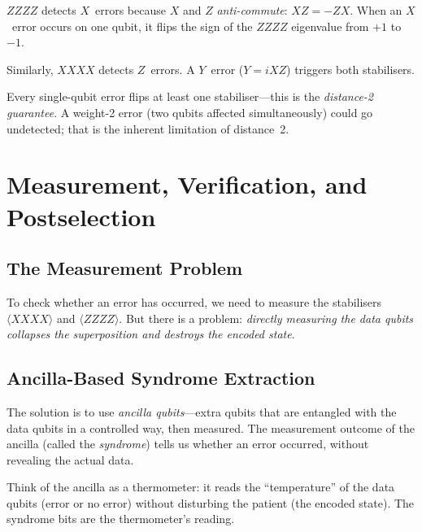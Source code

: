 \documentclass[11pt,a4paper,twoside]{report}
\theoremstyle{definition}
\newcommand{\expect}[1]{\langle #1 \rangle}
\begin{document}
\begin{concept}[title={Why ZZZZ Detects X Errors}]
$ZZZZ$ detects $X$~errors because $X$ and $Z$ \emph{anti-commute}:
$XZ = -ZX$. When an $X$~error occurs on one qubit, it flips the sign
of the $ZZZZ$ eigenvalue from $+1$ to $-1$.

Similarly, $XXXX$ detects $Z$~errors. A $Y$~error ($Y = iXZ$) triggers
both stabilisers.
\end{concept}

Every single-qubit error flips at least one stabiliser---this is the
\emph{distance-2 guarantee}. A weight-2 error (two qubits affected
simultaneously) could go undetected; that is the inherent limitation of
distance~2.

\chapter{Measurement, Verification, and Postselection}
\label{ch:measurement}

\section{The Measurement Problem}

To check whether an error has occurred, we need to measure the
stabilisers $\expect{XXXX}$ and $\expect{ZZZZ}$. But there is a
problem: \emph{directly measuring the data qubits collapses the
superposition and destroys the encoded state}.

\section{Ancilla-Based Syndrome Extraction}

The solution is to use \emph{ancilla qubits}---extra qubits that are
entangled with the data qubits in a controlled way, then measured. The
measurement outcome of the ancilla (called the \emph{syndrome}) tells us
whether an error occurred, without revealing the actual data.

\begin{intuition}
Think of the ancilla as a thermometer: it reads the ``temperature'' of
the data qubits (error or no error) without disturbing the patient
(the encoded state). The syndrome bits are the thermometer's reading.
\end{intuition}
\end{document}
